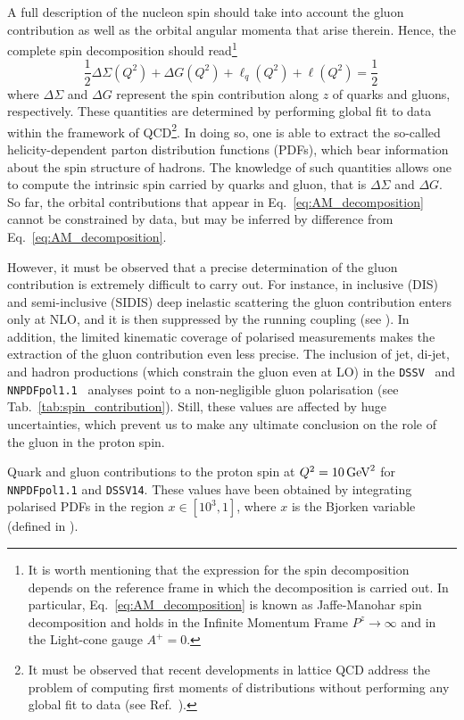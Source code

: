 A full description of the nucleon spin should take into account the gluon contribution as well as the orbital angular momenta that arise therein. Hence, the complete spin decomposition should read\footnote{\footnotesize It is worth mentioning that the expression for the spin decomposition depends on the reference frame in which the decomposition is carried out. In particular, Eq.~\eqref{eq:AM_decomposition} is known as Jaffe-Manohar spin decomposition and holds in the Infinite Momentum Frame $P^z \rightarrow \infty$ and in the Light-cone gauge $A^+=0$.}
%
\begin{equation}
  \frac{1}{2} \Delta \Sigma(Q^2) + \Delta G(Q^2) + \ell_{q}(Q^2) + \ell(Q^2) = \frac{1}{2} \,
  \label{eq:AM_decomposition}
\end{equation}
%
where $\Delta \Sigma$ and $\Delta G$ represent the spin contribution along $z$ of quarks and gluons, respectively. These quantities are determined by performing global fit to data within the framework of QCD\footnote{\footnotesize It must be observed that recent developments in lattice QCD address the problem of computing first moments of distributions without performing any global fit to data (see Ref.~\cite{Constantinou:2020hdm}).}. In doing so, one is able to extract the so-called helicity-dependent parton distribution functions (PDFs), which bear information about the spin structure of hadrons. The knowledge of such quantities allows one to compute the intrinsic spin carried by quarks and gluon, that is $\Delta \Sigma$ and $\Delta G$. So far, the orbital contributions that appear in Eq.~\eqref{eq:AM_decomposition} cannot be constrained by data, but may be inferred by difference from Eq.~\eqref{eq:AM_decomposition}.%

However, it must be observed that a precise determination of the gluon contribution is extremely difficult to carry out. For instance, in inclusive (DIS) and semi-inclusive (SIDIS) deep inelastic scattering the gluon contribution enters only at NLO, and it is then suppressed by the running coupling (see ). In addition, the limited kinematic coverage of polarised measurements makes the extraction of the gluon contribution even less precise. The inclusion of jet, di-jet, and hadron productions (which constrain the gluon even at LO) in the \texttt{DSSV}~\cite{DeFlorian:2019xxt} and \texttt{NNPDFpol1.1}~\cite{Nocera:2014gqa} analyses point to a non-negligible gluon polarisation (see Tab.~\ref{tab:spin_contribution}). Still, these values are affected by huge uncertainties, which prevent us to make any ultimate conclusion on the role of the gluon in the proton spin.
\begin{table}[t]
  \centering 
  \small
  
  \caption{
    \small
    Quark and gluon contributions to the proton spin at $Q^2 = 10 \, \textrm{GeV}^2$ for \texttt{NNPDFpol1.1} and \texttt{DSSV14}. These values have been obtained by integrating polarised PDFs in the region $x \in [10^3,1]$, where $x$ is the Bjorken variable (defined in ).
  \label{tab:spin_contribution}}
\end{table}

